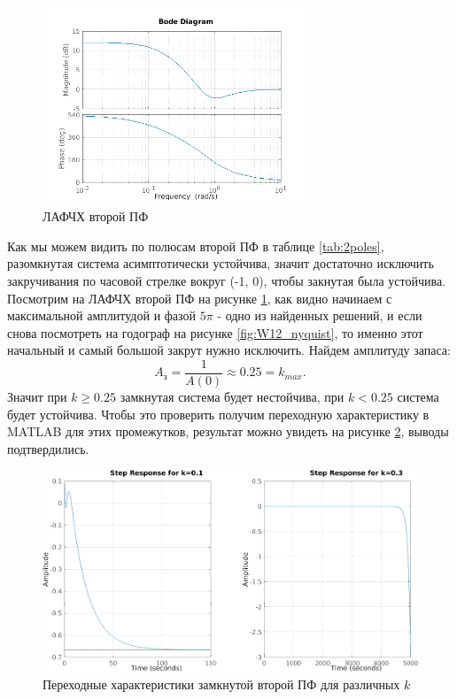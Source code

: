 \begin{figure}[H]
    \centering
    \includegraphics[width=0.7\textwidth]{figs/task_2_W2_bode.png}
    \caption{ЛАФЧХ второй ПФ}
    \label{fig:2W2_bode}
\end{figure}

Как мы можем видить по полюсам второй ПФ в таблице \ref{tab:2poles},
разомкнутая система асимптотически устойчива, значит достаточно исключить 
закручивания по часовой стрелке вокруг (-1, 0), чтобы закнутая была устойчива.
Посмотрим на ЛАФЧХ второй ПФ на рисунке \ref{fig:2W2_bode}, как видно начинаем
с максимальной амплитудой и фазой $5\pi$ - одно из найденных решений, и если снова
посмотреть на годограф на рисунке \ref{fig:W12_nyquist}, то именно этот начальный и самый
большой закрут нужно исключить. Найдем
амплитуду запаса:
\begin{equation*}
    A_\text{з}=\frac{1}{A(0)}\approx 0.25=k_{max}.
\end{equation*}
Значит при $k\geq 0.25$ замкнутая система будет нестойчива, при $k<0.25$ система будет
устойчива. Чтобы это проверить получим переходную характеристику
в MATLAB для этих промежутков, результат можно увидеть на рисунке \ref{fig:W2_step},
выводы подтвердились.

\begin{figure}[H]
    \centering
    \includegraphics[width=\textwidth]{figs/task_2_W2_ksteps.png}
    \caption{Переходные характеристики замкнутой второй ПФ для различных $k$}
    \label{fig:W2_step}
\end{figure}


